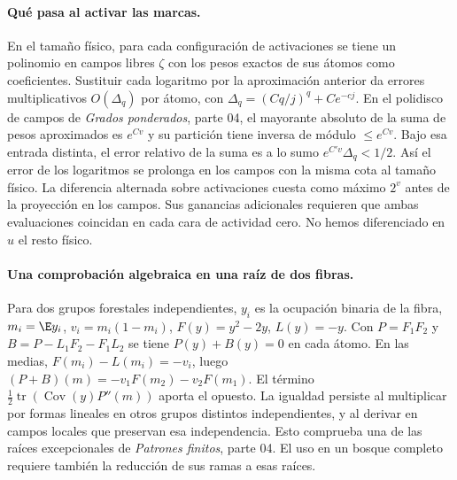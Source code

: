 \paragraph{Qué pasa al activar las marcas.}
En el tamaño físico, para cada configuración de activaciones se tiene un polinomio
en campos libres $\zeta$ con los pesos exactos de sus átomos como coeficientes.
Sustituir cada logaritmo por la aproximación anterior da errores multiplicativos
$O(\Delta_q)$ por átomo, con $\Delta_q=(Cq/j)^q+Ce^{-cj}$.
En el polidisco de campos de \emph{Grados ponderados}, parte 04, el mayorante
absoluto de la suma de pesos aproximados es $e^{Cv}$ y su partición tiene
inversa de módulo $\le e^{Cv}$. Bajo esa entrada distinta, el error relativo
de la suma es a lo sumo $e^{C'v}\Delta_q<1/2$. Así el error de los logaritmos
se prolonga en los campos con la misma cota al tamaño físico.
La diferencia alternada sobre activaciones cuesta como máximo $2^v$ antes de la
proyección en los campos. Sus ganancias adicionales requieren que ambas evaluaciones
coincidan en cada cara de actividad cero. No hemos diferenciado en $u$ el resto físico.
\paragraph{Una comprobación algebraica en una raíz de dos fibras.}
Para dos grupos forestales independientes, $y_i$ es la ocupación binaria de la fibra,
$m_i=\E y_i$, $v_i=m_i(1-m_i)$, $F(y)=y^2-2y$, $L(y)=-y$.
Con $P=F_1F_2$ y $B=P-L_1F_2-F_1L_2$ se tiene $P(y)+B(y)=0$ en cada átomo.
En las medias, $F(m_i)-L(m_i)=-v_i$, luego $(P+B)(m)=-v_1F(m_2)-v_2F(m_1)$.
El término $\frac12\operatorname{tr}(\operatorname{Cov}(y)P''(m))$ aporta el opuesto.
La igualdad persiste al multiplicar por formas lineales en otros grupos distintos
independientes, y al derivar en campos locales que preservan esa independencia.
Esto comprueba una de las raíces excepcionales de \emph{Patrones finitos}, parte 04.
El uso en un bosque completo requiere también la reducción de sus ramas a esas raíces.
